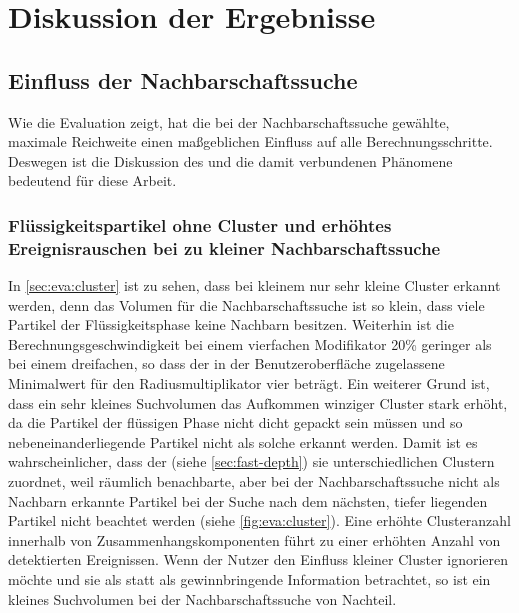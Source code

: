 \chapter{Diskussion der Ergebnisse}\label{sec:diskussion}

\section{Einfluss der Nachbarschaftssuche}\label{sec:eva:nachbarschaftssuche}

Wie die Evaluation zeigt, hat die bei der Nachbarschaftssuche gewählte, maximale Reichweite einen maßgeblichen Einfluss auf alle Berechnungsschritte. Deswegen ist die Diskussion des   und die damit verbundenen Phänomene bedeutend für diese Arbeit.

\subsection*{Flüssigkeitspartikel ohne Cluster und erhöhtes Ereignisrauschen bei zu kleiner Nachbarschaftssuche}
In \autoref{sec:eva:cluster} ist zu sehen, dass bei kleinem  nur sehr kleine Cluster erkannt werden, denn das Volumen für die Nachbarschaftssuche ist so klein, dass viele Partikel der Flüssigkeitsphase keine Nachbarn besitzen. Weiterhin ist die Berechnungsgeschwindigkeit bei einem vierfachen Modifikator 20\% geringer als bei einem dreifachen, so dass der in der Benutzeroberfläche zugelassene Minimalwert für den Radiusmultiplikator vier beträgt. Ein weiterer Grund ist, dass ein sehr kleines Suchvolumen das Aufkommen winziger Cluster stark erhöht, da die Partikel der flüssigen Phase nicht dicht gepackt sein müssen und so nebeneinanderliegende Partikel nicht als solche erkannt werden. 
Damit ist es wahrscheinlicher, dass der \CFD (siehe \autoref{sec:fast-depth}) sie unterschiedlichen Clustern zuordnet, weil räumlich benachbarte, aber bei der Nachbarschaftssuche nicht als Nachbarn erkannte Partikel bei der Suche nach dem nächsten, tiefer liegenden Partikel nicht beachtet werden (siehe \autoref{fig:eva:cluster}). Eine erhöhte Clusteranzahl innerhalb von Zusammenhangskomponenten führt zu einer erhöhten Anzahl von detektierten Ereignissen. Wenn der Nutzer den Einfluss kleiner Cluster ignorieren möchte und sie als  statt als gewinnbringende Information betrachtet, so ist ein kleines Suchvolumen bei der Nachbarschaftssuche von Nachteil.

